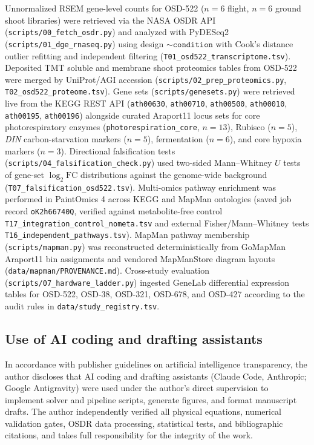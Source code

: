 \documentclass[10pt,twocolumn,a4paper]{article}
\begin{document}
Unnormalized RSEM gene-level counts for OSD-522 ($n=6$ flight, $n=6$ ground shoot libraries) were retrieved via the NASA OSDR API (\texttt{scripts/00\_fetch\_osdr.py}) and analyzed with PyDESeq2 \citep{pydeseq2} (\texttt{scripts/01\_dge\_rnaseq.py}) using design $\sim\texttt{condition}$ with Cook's distance outlier refitting and independent filtering (\texttt{T01\_osd522\_transcriptome.tsv}). Deposited TMT soluble and membrane shoot proteomics tables from OSD-522 were merged by UniProt/AGI accession (\texttt{scripts/02\_prep\_proteomics.py}, \texttt{T02\_osd522\_proteome.tsv}). Gene sets (\texttt{scripts/genesets.py}) were retrieved live from the KEGG REST API \citep{kanehisa2000,kegg} (\texttt{ath00630}, \texttt{ath00710}, \texttt{ath00500}, \texttt{ath00010}, \texttt{ath00195}, \texttt{ath00196}) alongside curated Araport11 locus sets for core photorespiratory enzymes (\texttt{photorespiration\_core}, $n=13$), Rubisco ($n=5$), \textit{DIN} carbon-starvation markers ($n=5$), fermentation ($n=6$), and core hypoxia markers ($n=3$). Directional falsification tests (\texttt{scripts/04\_falsification\_check.py}) used two-sided Mann--Whitney $U$ tests of gene-set $\log_2\mathrm{FC}$ distributions against the genome-wide background (\texttt{T07\_falsification\_osd522.tsv}). Multi-omics pathway enrichment was performed in PaintOmics 4 \citep{paintomics4} across KEGG and MapMan ontologies (saved job record \texttt{oK2h66740Q}, verified against metabolite-free control \texttt{T17\_integration\_control\_nometa.tsv} and external Fisher/Mann--Whitney tests \texttt{T16\_independent\_pathways.tsv}). MapMan pathway membership (\texttt{scripts/mapman.py}) was reconstructed deterministically from GoMapMan Araport11 bin assignments and vendored MapManStore diagram layouts (\texttt{data/mapman/PROVENANCE.md}). Cross-study evaluation (\texttt{scripts/07\_hardware\_ladder.py}) ingested GeneLab differential expression tables for OSD-522, OSD-38, OSD-321, OSD-678, and OSD-427 according to the audit rules in \texttt{data/study\_registry.tsv}.

\subsection*{Use of AI coding and drafting assistants}

In accordance with publisher guidelines on artificial intelligence transparency, the author discloses that AI coding and drafting assistants (Claude Code, Anthropic; Google Antigravity) were used under the author's direct supervision to implement solver and pipeline scripts, generate figures, and format manuscript drafts. The author independently verified all physical equations, numerical validation gates, OSDR data processing, statistical tests, and bibliographic citations, and takes full responsibility for the integrity of the work.
\end{document}
